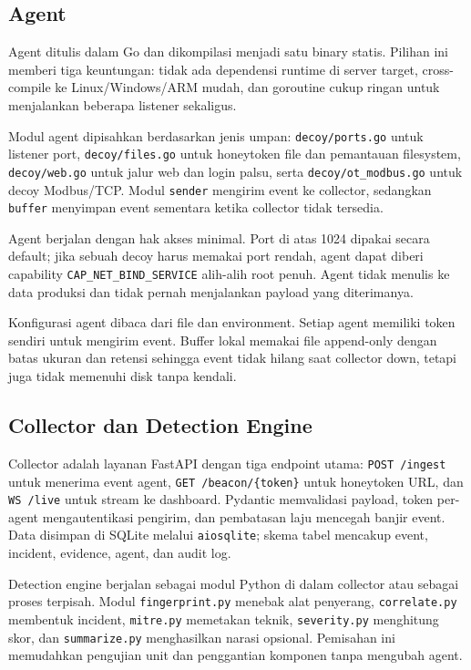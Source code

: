 \documentclass[12pt,a4paper]{article}
\begin{document}
\subsection{Agent}

Agent ditulis dalam Go dan dikompilasi menjadi satu binary statis. Pilihan ini memberi tiga keuntungan: tidak ada dependensi runtime di server target, cross-compile ke Linux/Windows/ARM mudah, dan goroutine cukup ringan untuk menjalankan beberapa listener sekaligus.

Modul agent dipisahkan berdasarkan jenis umpan: \texttt{decoy/ports.go} untuk listener port, \texttt{decoy/files.go} untuk honeytoken file dan pemantauan filesystem, \texttt{decoy/web.go} untuk jalur web dan login palsu, serta \texttt{decoy/ot\_modbus.go} untuk decoy Modbus/TCP. Modul \texttt{sender} mengirim event ke collector, sedangkan \texttt{buffer} menyimpan event sementara ketika collector tidak tersedia.

Agent berjalan dengan hak akses minimal. Port di atas 1024 dipakai secara default; jika sebuah decoy harus memakai port rendah, agent dapat diberi capability \texttt{CAP\_NET\_BIND\_SERVICE} alih-alih root penuh. Agent tidak menulis ke data produksi dan tidak pernah menjalankan payload yang diterimanya.

Konfigurasi agent dibaca dari file dan environment. Setiap agent memiliki token sendiri untuk mengirim event. Buffer lokal memakai file append-only dengan batas ukuran dan retensi sehingga event tidak hilang saat collector down, tetapi juga tidak memenuhi disk tanpa kendali.

\subsection{Collector dan Detection Engine}

Collector adalah layanan FastAPI dengan tiga endpoint utama: \texttt{POST /ingest} untuk menerima event agent, \texttt{GET /beacon/\{token\}} untuk honeytoken URL, dan \texttt{WS /live} untuk stream ke dashboard. Pydantic memvalidasi payload, token per-agent mengautentikasi pengirim, dan pembatasan laju mencegah banjir event. Data disimpan di SQLite melalui \texttt{aiosqlite}; skema tabel mencakup event, incident, evidence, agent, dan audit log.

Detection engine berjalan sebagai modul Python di dalam collector atau sebagai proses terpisah. Modul \texttt{fingerprint.py} menebak alat penyerang, \texttt{correlate.py} membentuk incident, \texttt{mitre.py} memetakan teknik, \texttt{severity.py} menghitung skor, dan \texttt{summarize.py} menghasilkan narasi opsional. Pemisahan ini memudahkan pengujian unit dan penggantian komponen tanpa mengubah agent.
\end{document}
